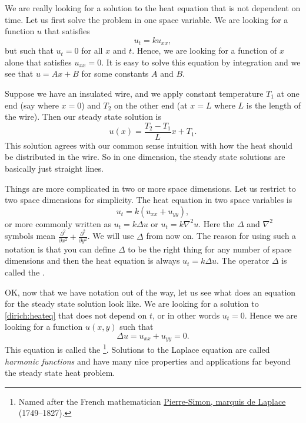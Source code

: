 We are really looking for a solution to the heat equation that is not
dependent on time.  Let us first solve the problem in one space variable.  We are
looking for a function $u$ that satisfies
\begin{equation*}
u_t = k u_{xx} ,
\end{equation*}
but such that $u_t = 0$ for all $x$ and $t$.  Hence, we are looking for a
function of $x$ alone that satisfies $u_{xx} = 0$.  It is easy to solve this
equation by integration and we see that $u = Ax+B$ for some constants $A$ and
$B$.

Suppose we have an insulated wire, and we apply constant temperature $T_1$
at one end (say where $x=0$) and $T_2$ on the other end (at $x=L$ where $L$
is the length of the wire).  Then our steady state solution is
\begin{equation*}
u(x) = \frac{T_2-T_1}{L} x + T_1 .
\end{equation*}
This solution agrees with our common sense intuition with how the heat should be
distributed in the wire.  So in one dimension, the steady state solutions
are basically just straight lines.

Things are more complicated in two or more space dimensions.  Let us
restrict to two space dimensions for simplicity.  The heat equation in two
space variables is
\begin{equation} \label{dirich:heateq}
u_t = k(u_{xx} + u_{yy}) ,
\end{equation}
or more commonly written as
$u_t = k \Delta u$ or
$u_t = k \nabla^2 u$.  Here the $\Delta$ and $\nabla^2$ symbols
mean $\frac{\partial^2}{\partial x^2} +
\frac{\partial^2}{\partial y^2}$.  We will use $\Delta$
from now on.  The reason for using such a notation is that you
can define $\Delta$ to be the right thing for any number of space
dimensions and then the heat equation is always
$u_t = k \Delta u$.  The operator $\Delta$ is called the \emph{}.

OK, now that we have notation out of the way, let us see what does an equation
for the steady state solution look like.  We are looking for a solution to
\eqref{dirich:heateq} that does not depend on $t$, or in other words $u_t =
0$.  Hence we are looking for a
function $u(x,y)$ such that
\begin{equation*}
\boxed{~~
\Delta u = 
u_{xx} + u_{yy} = 0 .
~~}
\end{equation*}
This equation is called the \emph{}%
\footnote{Named after the French mathematician
\href{http://en.wikipedia.org/wiki/Laplace}{Pierre-Simon, marquis de Laplace}
(1749--1827).}.
Solutions to the Laplace equation
are called \emph{harmonic functions}
and have many nice properties and
applications far beyond the steady state heat problem.

